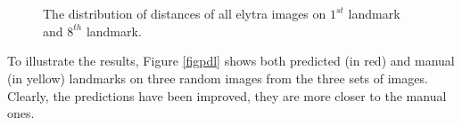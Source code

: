 \documentclass[review]{elsarticle}
\begin{document}
\begin{figure}[h!]
    \centering
    ~~
    \\
    ~~
    \caption{The distribution of distances of all elytra images on $1^{st}$ landmark and $8^{th}$ landmark.}
    \label{figchartefn}
\end{figure}

To illustrate the results, Figure \ref{figpdl} shows both predicted (in red) and manual (in yellow) landmarks on three random images from the three sets of images. Clearly, the predictions have been improved, they are more closer to the manual ones.
\end{document}
